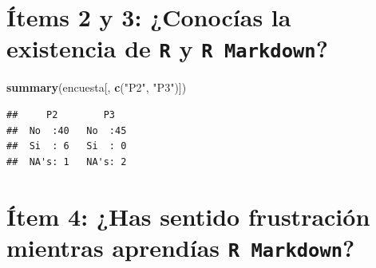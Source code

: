 \documentclass[
]{article}
\newenvironment{Shaded}{\begin{snugshade}}{\end{snugshade}}
\newcommand{\FunctionTok}[1]{\textcolor[rgb]{0.13,0.29,0.53}{\textbf{#1}}}
\newcommand{\NormalTok}[1]{#1}
\newcommand{\StringTok}[1]{\textcolor[rgb]{0.31,0.60,0.02}{#1}}
\begin{document}
\hypertarget{uxedtems-2-y-3-conocuxedas-la-existencia-de-y}{%
\section{\texorpdfstring{Ítems 2 y 3: ¿Conocías la existencia de
\texttt{R} y
\texttt{R Markdown}?}{Ítems 2 y 3: ¿Conocías la existencia de  y ?}}\label{uxedtems-2-y-3-conocuxedas-la-existencia-de-y}}

\begin{Shaded}
\begin{Highlighting}[]
\FunctionTok{summary}\NormalTok{(encuesta[, }\FunctionTok{c}\NormalTok{(}\StringTok{"P2"}\NormalTok{, }\StringTok{"P3"}\NormalTok{)])}
\end{Highlighting}
\end{Shaded}

\begin{verbatim}
##     P2        P3    
##  No  :40   No  :45  
##  Si  : 6   Si  : 0  
##  NA's: 1   NA's: 2
\end{verbatim}

\hypertarget{uxedtem-4-has-sentido-frustraciuxf3n-mientras-aprenduxedas}{%
\section{\texorpdfstring{Ítem 4: ¿Has sentido frustración mientras
aprendías
\texttt{R Markdown}?}{Ítem 4: ¿Has sentido frustración mientras aprendías ?}}\label{uxedtem-4-has-sentido-frustraciuxf3n-mientras-aprenduxedas}}
\end{document}
